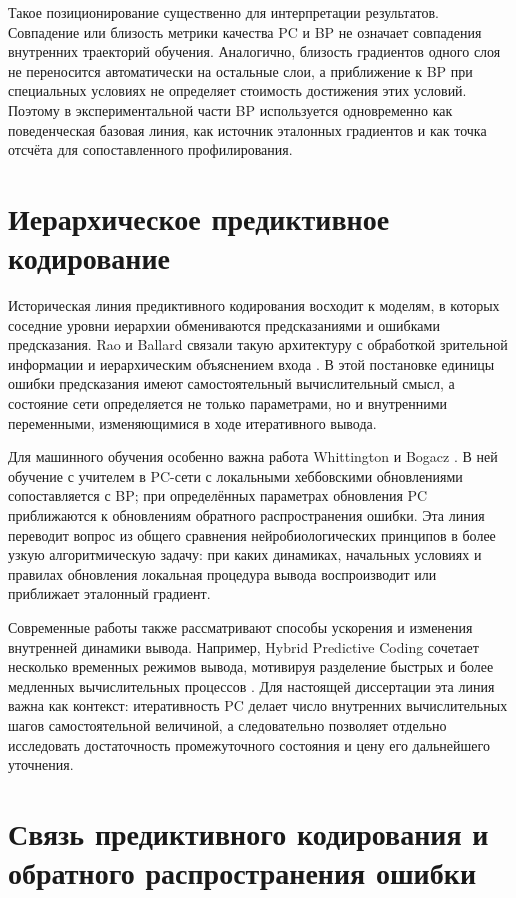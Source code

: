 Такое позиционирование существенно для интерпретации результатов. Совпадение
или близость метрики качества PC и BP не означает совпадения внутренних
траекторий обучения. Аналогично, близость градиентов одного слоя не переносится
автоматически на остальные слои, а приближение к BP при специальных условиях
не определяет стоимость достижения этих условий. Поэтому в экспериментальной
части BP используется одновременно как поведенческая базовая линия, как
источник эталонных градиентов и как точка отсчёта для сопоставленного
профилирования.

\section{Иерархическое предиктивное кодирование}
\label{sec:related-pc}

Историческая линия предиктивного кодирования восходит к моделям, в которых
соседние уровни иерархии обмениваются предсказаниями и ошибками предсказания.
Rao и Ballard связали такую архитектуру с обработкой зрительной информации и
иерархическим объяснением входа \cite{rao1999predictive}. В этой постановке
единицы ошибки предсказания имеют самостоятельный вычислительный смысл, а
состояние сети определяется не только параметрами, но и внутренними
переменными, изменяющимися в ходе итеративного вывода.

Для машинного обучения особенно важна работа Whittington и Bogacz
\cite{whittington2017approximation}. В ней обучение с учителем в PC-сети с
локальными хеббовскими обновлениями сопоставляется с BP; при определённых
параметрах обновления PC приближаются к обновлениям обратного распространения
ошибки. Эта линия переводит вопрос из общего сравнения нейробиологических
принципов в более узкую алгоритмическую задачу: при каких динамиках, начальных
условиях и правилах обновления локальная процедура вывода воспроизводит или
приближает эталонный градиент.

Современные работы также рассматривают способы ускорения и изменения внутренней
динамики вывода. Например, Hybrid Predictive Coding сочетает несколько
временных режимов вывода, мотивируя разделение быстрых и более медленных
вычислительных процессов \cite{tschantz2023hybrid}. Для настоящей диссертации
эта линия важна как контекст: итеративность PC делает число внутренних
вычислительных шагов самостоятельной величиной, а следовательно позволяет
отдельно исследовать достаточность промежуточного состояния и цену его
дальнейшего уточнения.

\section{Связь предиктивного кодирования и обратного распространения ошибки}
\label{sec:related-pc-bp}

